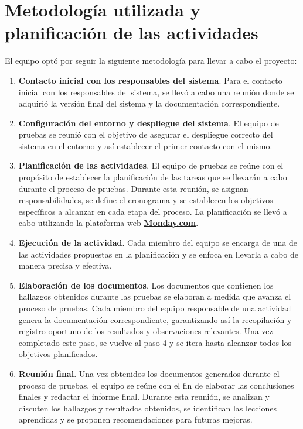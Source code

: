 \documentclass[10pt,times,twocolumn]{article}
\begin{document}
\section{Metodología utilizada y planificación de las actividades}

El equipo optó por seguir la siguiente metodología para llevar a cabo el proyecto:

\begin{enumerate}
	\item \textbf{Contacto inicial con los responsables del sistema}. Para el contacto inicial con los responsables del sistema, se llevó a cabo una reunión donde se adquirió la versión final del sistema y la documentación correspondiente.
	\item \textbf{Configuración del entorno y despliegue del sistema}. El equipo de pruebas se reunió con el objetivo de asegurar el despliegue correcto del sistema en el entorno y así establecer el primer contacto con el mismo.
	\item \textbf{Planificación de las actividades}. El equipo de pruebas se reúne con el propósito de establecer la planificación de las tareas que se llevarán a cabo durante el proceso de pruebas. Durante esta reunión, se asignan responsabilidades, se define el cronograma y se establecen los objetivos específicos a alcanzar en cada etapa del proceso. La planificación se llevó a cabo utilizando la plataforma web \href{https://monday.com}{\textbf{Monday.com}}.
	\item \textbf{Ejecución de la actividad}. Cada miembro del equipo se encarga de una de las actividades propuestas en la planificación y se enfoca en llevarla a cabo de manera precisa y efectiva.
	\item \textbf{Elaboración de los documentos}. Los documentos que contienen los hallazgos obtenidos durante las pruebas se elaboran a medida que avanza el proceso de pruebas. Cada miembro del equipo responsable de una actividad genera la documentación correspondiente, garantizando así la recopilación y registro oportuno de los resultados y observaciones relevantes. Una vez completado este paso, se vuelve al paso 4 y se itera hasta alcanzar todos los objetivos planificados.
	\item \textbf{Reunión final}. Una vez obtenidos los documentos generados durante el proceso de pruebas, el equipo se reúne con el fin de elaborar las conclusiones finales y redactar el informe final. Durante esta reunión, se analizan y discuten los hallazgos y resultados obtenidos, se identifican las lecciones aprendidas y se proponen recomendaciones para futuras mejoras.
\end{enumerate}
\end{document}
